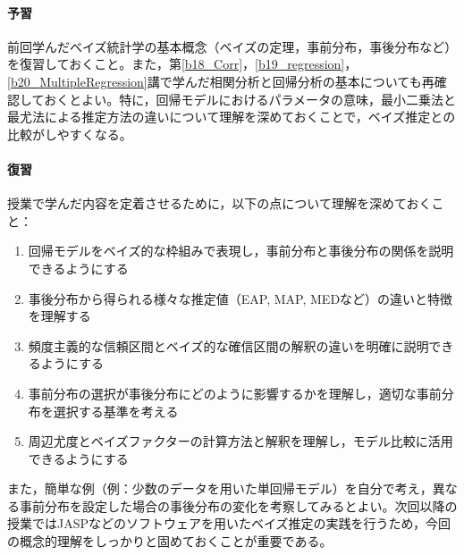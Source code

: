 \paragraph{予習}
前回学んだベイズ統計学の基本概念（ベイズの定理，事前分布，事後分布など）を復習しておくこと。また，第\ref{b18_Corr}，\ref{b19_regression}，\ref{b20_MultipleRegression}講で学んだ相関分析と回帰分析の基本についても再確認しておくとよい。特に，回帰モデルにおけるパラメータの意味，最小二乗法と最尤法による推定方法の違いについて理解を深めておくことで，ベイズ推定との比較がしやすくなる。

\paragraph{復習}
授業で学んだ内容を定着させるために，以下の点について理解を深めておくこと：

\begin{enumerate}
\item 回帰モデルをベイズ的な枠組みで表現し，事前分布と事後分布の関係を説明できるようにする
\item 事後分布から得られる様々な推定値（EAP, MAP, MEDなど）の違いと特徴を理解する
\item 頻度主義的な信頼区間とベイズ的な確信区間の解釈の違いを明確に説明できるようにする
\item 事前分布の選択が事後分布にどのように影響するかを理解し，適切な事前分布を選択する基準を考える
\item 周辺尤度とベイズファクターの計算方法と解釈を理解し，モデル比較に活用できるようにする
\end{enumerate}

また，簡単な例（例：少数のデータを用いた単回帰モデル）を自分で考え，異なる事前分布を設定した場合の事後分布の変化を考察してみるとよい。次回以降の授業ではJASPなどのソフトウェアを用いたベイズ推定の実践を行うため，今回の概念的理解をしっかりと固めておくことが重要である。
